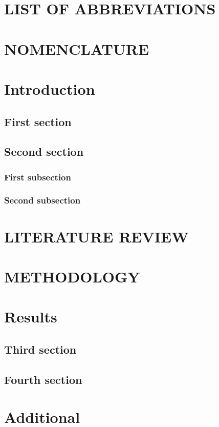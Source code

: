 \documentclass[11pt,a4paper,oneside]{memoir}
\begin{document}
\chapter*{LIST OF ABBREVIATIONS}


\chapter*{NOMENCLATURE}
















\mainmatter
\chapter{Introduction}



\section{First section}
 


\section{Second section}


\subsection{First subsection}


\subsection{Second subsection}


\chapter{LITERATURE REVIEW}

\chapter{METHODOLOGY}


\chapter{Results}

\section{Third section}

\section{Fourth section}


\appendix

\chapter{Additional}




\end{document}
